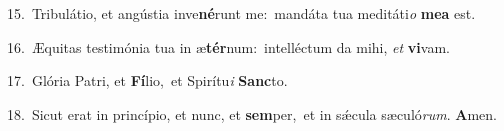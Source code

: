 {\numbfont\textcolor{\numbcolor}{15.}}~Tribulátio, et angústia inve\-\textbf{né}\-runt me:~\star mandáta tua meditáti\textit{o} \textbf{me}\-\textbf{a} est.\par
{\numbfont\textcolor{\numbcolor}{16.}}~Æquitas testimónia tua in æ\-\textbf{tér}\-num:~\star intelléctum da mihi, \textit{et} \textbf{vi}\-vam.\par
{\numbfont\textcolor{\numbcolor}{17.}}~Glória Patri, et \textbf{Fí}\-lio,~\star et Spirítu\textit{i} \textbf{Sanc}\-to.\par
{\numbfont\textcolor{\numbcolor}{18.}}~Sicut erat in princípio, et nunc, et \textbf{sem}\-per,~\star et in sǽcula sæculó\-\textit{rum}\-. \textbf{A}\-men.\par
